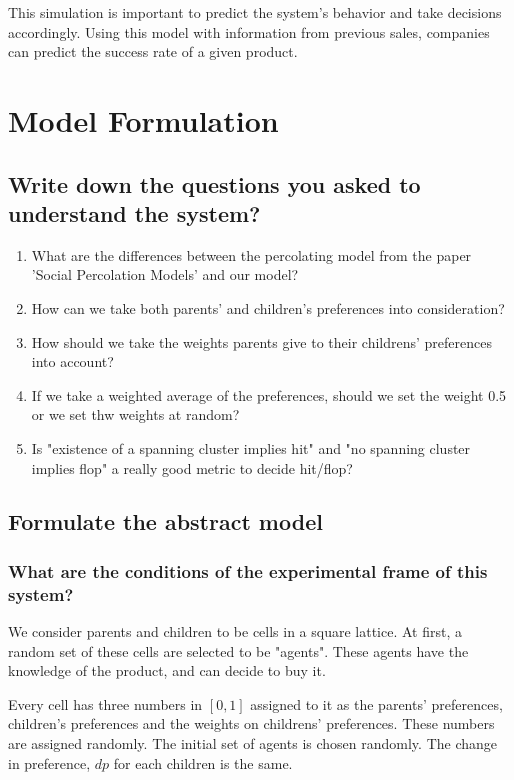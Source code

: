 \documentclass[article, 11pt, a4paper, onesize]{memoir}
\begin{document}
This simulation is important to predict the system's behavior and take decisions
accordingly. Using this model with information from previous sales, companies can predict
the success rate of a given product.


\chapter{Model Formulation}

\section{Write down the questions you asked to understand the system?}

\begin{enumerate}
\item What are the differences between the percolating model from the paper 'Social
    Percolation Models' and our model?  
\item How can we take both parents' and children's preferences into consideration?  
\item How should we take the weights parents give to their childrens' preferences into
    account?
\item If we take a weighted average of the preferences, should we set the weight 0.5 or we
    set thw weights at random?  
\item Is "existence of a spanning cluster implies hit" and "no spanning cluster implies
    flop" a really good metric to decide hit/flop?
\end{enumerate}



\section{Formulate the abstract model}

\subsection{What are the conditions of the experimental frame of this system?}

We consider parents and children to be cells in a square lattice. At first, a random set
of these cells are selected to be "agents". These agents have the knowledge of the
product, and can decide to buy it. 

Every cell has three numbers in \([0,1]\) assigned to it as the parents' preferences,
children's preferences and the weights on childrens' preferences. These numbers are
assigned randomly. The initial set of agents is chosen randomly. The change in
preference, \(dp\) for each children is the same.
\end{document}
